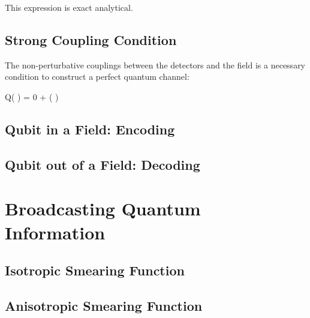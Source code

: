\documentclass[a4paper,12pt]{article}
\begin{document}
This expression is exact analytical. 

\subsection*{Strong Coupling Condition}
The non-perturbative couplings between the detectors and the field is a necessary condition to construct a perfect quantum channel:

\be
    Q( \Xi  ) = 0 +  ( \lambda )
\ee

\subsection*{Qubit in a Field: Encoding}

\subsection*{Qubit out of a Field: Decoding}

\section{Broadcasting Quantum Information}

\subsection*{Isotropic Smearing Function}

\subsection*{Anisotropic Smearing Function}

\appendix

\acknowledgments






\end{document}
